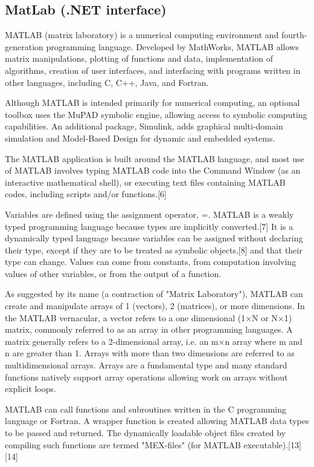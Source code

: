 	
	
	\newpage
	\subsection{MatLab (.NET interface)}
	\label{MatLabNET}
	
	MATLAB (matrix laboratory) is a numerical computing environment and fourth-generation programming language. Developed by MathWorks, MATLAB allows matrix manipulations, plotting of functions and data, implementation of algorithms, creation of user interfaces, and interfacing with programs written in other languages, including C, C++, Java, and Fortran.
	
	\vpara
	Although MATLAB is intended primarily for numerical computing, an optional toolbox uses the MuPAD symbolic engine, allowing access to symbolic computing capabilities. An additional package, Simulink, adds graphical multi-domain simulation and Model-Based Design for dynamic and embedded systems.
	
	\vpara
	The MATLAB application is built around the MATLAB language, and most use of MATLAB involves typing MATLAB code into the Command Window (as an interactive mathematical shell), or executing text files containing MATLAB codes, including scripts and/or functions.[6]
	
	\vpara
	Variables are defined using the assignment operator, =. MATLAB is a weakly typed programming language because types are implicitly converted.[7] It is a dynamically typed language because variables can be assigned without declaring their type, except if they are to be treated as symbolic objects,[8] and that their type can change. Values can come from constants, from computation involving values of other variables, or from the output of a function. 
	
	\vpara
	As suggested by its name (a contraction of "Matrix Laboratory"), MATLAB can create and manipulate arrays of 1 (vectors), 2 (matrices), or more dimensions. In the MATLAB vernacular, a vector refers to a one dimensional (1×N or N×1) matrix, commonly referred to as an array in other programming languages. A matrix generally refers to a 2-dimensional array, i.e. an m×n array where m and n are greater than 1. Arrays with more than two dimensions are referred to as multidimensional arrays. Arrays are a fundamental type and many standard functions natively support array operations allowing work on arrays without explicit loops.
	
	\vpara
	MATLAB can call functions and subroutines written in the C programming language or Fortran. A wrapper function is created allowing MATLAB data types to be passed and returned. The dynamically loadable object files created by compiling such functions are termed "MEX-files" (for MATLAB executable).[13][14]
	
